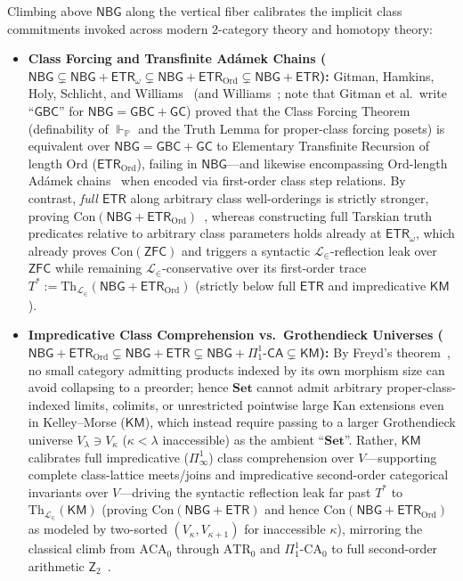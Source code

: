 Climbing above $\mathsf{NBG}$ along the vertical fiber calibrates the implicit class commitments invoked across modern $2$-category theory and homotopy theory:
\begin{itemize}
  \item \textbf{Class Forcing and Transfinite Ad\'amek Chains ($\mathsf{NBG} \subsetneq \mathsf{NBG} + \mathsf{ETR}_\omega \subsetneq \mathsf{NBG} + \mathsf{ETR}_{\mathrm{Ord}} \subsetneq \mathsf{NBG} + \mathsf{ETR}$):} Gitman, Hamkins, Holy, Schlicht, and Williams~\cite[Thm.~1.2]{Gitman20} (and Williams~\cite{Williams18}; note that Gitman et al.\ write ``$\mathsf{GBC}$'' for $\mathsf{NBG} = \mathsf{GBC} + \mathsf{GC}$) proved that the Class Forcing Theorem (definability of $\Vdash_{\mathbb{P}}$ and the Truth Lemma for proper-class forcing posets) is equivalent over $\mathsf{NBG} = \mathsf{GBC} + \mathsf{GC}$ to Elementary Transfinite Recursion of length $\mathrm{Ord}$ ($\mathsf{ETR}_{\mathrm{Ord}}$), failing in $\mathsf{NBG}$---and likewise encompassing $\mathrm{Ord}$-length Ad\'amek chains~\cite{Goldthorpe23} when encoded via first-order class step relations. By contrast, \emph{full $\mathsf{ETR}$} along arbitrary class well-orderings is strictly stronger, proving $\mathrm{Con}(\mathsf{NBG} + \mathsf{ETR}_{\mathrm{Ord}})$~\cite{Gitman20}, whereas constructing full Tarskian truth predicates relative to arbitrary class parameters holds already at $\mathsf{ETR}_\omega$, which already proves $\mathrm{Con}(\mathsf{ZFC})$ and triggers a syntactic $\mathcal{L}_\in$-reflection leak over $\mathsf{ZFC}$ while remaining $\mathcal{L}_\in$-conservative over its first-order trace $T^* := \mathrm{Th}_{\mathcal{L}_\in}(\mathsf{NBG} + \mathsf{ETR}_{\mathrm{Ord}})$ (strictly below full $\mathsf{ETR}$ and impredicative $\mathsf{KM}$).
  \item \textbf{Impredicative Class Comprehension vs.\ Grothendieck Universes ($\mathsf{NBG} + \mathsf{ETR}_{\mathrm{Ord}} \subsetneq \mathsf{NBG} + \mathsf{ETR} \subsetneq \mathsf{NBG} + \Pi^1_1\text{-}\mathsf{CA} \subsetneq \mathsf{KM}$):} By Freyd's theorem~\cite[Ch.~V, \S 2, Prop.~3]{MacLane98}, no small category admitting products indexed by its own morphism size can avoid collapsing to a preorder; hence $\mathbf{Set}$ cannot admit arbitrary proper-class-indexed limits, colimits, or unrestricted pointwise large Kan extensions even in Kelley--Morse ($\mathsf{KM}$), which instead require passing to a larger Grothendieck universe $V_\lambda \ni V_\kappa$ ($\kappa < \lambda$ inaccessible) as the ambient ``$\mathbf{Set}$''. Rather, $\mathsf{KM}$ calibrates full impredicative ($\Pi^1_\infty$) class comprehension over $V$---supporting complete class-lattice meets/joins and impredicative second-order categorical invariants over $V$---driving the syntactic reflection leak far past $T^*$ to $\mathrm{Th}_{\mathcal{L}_\in}(\mathsf{KM})$ (proving $\mathrm{Con}(\mathsf{NBG} + \mathsf{ETR})$ and hence $\mathrm{Con}(\mathsf{NBG} + \mathsf{ETR}_{\mathrm{Ord}})$ as modeled by two-sorted $(V_\kappa, V_{\kappa+1})$ for inaccessible $\kappa$), mirroring the classical climb from $\mathrm{ACA}_0$ through $\mathrm{ATR}_0$ and $\Pi^1_1\text{-}\mathrm{CA}_0$ to full second-order arithmetic $\mathsf{Z}_2$~\cite{Simpson09}.
\end{itemize}

